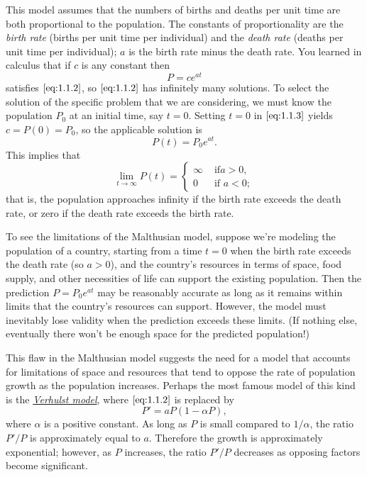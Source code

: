 \documentclass{ximera}
\begin{document}
This model assumes that the numbers of births and deaths per unit time
are both proportional to the population. The constants of
proportionality are  the \textit{birth rate} (births per unit
time per individual) and the \textit{death rate} (deaths per unit time
per individual);     $a$ is the birth rate minus the death rate.
You  learned in calculus that if $c$ is any constant then
\begin{equation} \label{eq:1.1.3}
P=ce^{at}
\end{equation}
satisfies $\eqref{eq:1.1.2}$, so $\eqref{eq:1.1.2}$ has infinitely
many solutions. To select the solution of the specific problem that
we are considering, we must know the population $P_0$ at an initial
time, say $t=0$. Setting $t=0$ in $\eqref{eq:1.1.3}$ yields
$c=P(0)=P_0$, so the applicable solution is
$$
P(t)=P_0e^{at}.
$$
This implies that
$$
\lim_{t\rightarrow\infty}P(t)=\left\{\begin{array}{cl}\infty&\mbox{ if
}a>0,\\ 0&\mbox{ if }a<0;    \end{array}\right.
$$
that is, the population approaches infinity if the birth rate exceeds
the death rate, or zero if the death rate exceeds the birth rate.
 
To see the limitations of the Malthusian model, suppose  we're
modeling the  population of a country, starting from a time
$t=0$ when the birth rate exceeds the death rate (so $a>0$), and
the country's resources in terms of space, food supply, and other
necessities of life can support the existing population. Then the
prediction $P=P_0e^{at}$ may be reasonably accurate as long as
it remains within limits that the country's resources can support.
However, the model must inevitably lose validity when the prediction
exceeds these limits. (If nothing else, eventually there won't be
enough space for the predicted population!)
 
This flaw in the Malthusian model suggests the need for a model that
accounts for limitations of space and resources that tend to oppose
the rate of population growth as the population increases.
 Perhaps the most famous model of this kind is the
\href{https://en.wikipedia.org/wiki/Pierre_Fran%C3%A7ois_Verhulst}
{\textit{Verhulst
 model}}, where $\eqref{eq:1.1.2}$ is
replaced by
\begin{equation} \label{eq:1.1.4}
P'=aP(1-\alpha P),
\end{equation}
where $\alpha$ is a positive constant.
As long as $P$ is small
compared to $1/\alpha$, the ratio $P'/P$  is approximately equal to $a$.
Therefore the growth is approximately exponential;     however, as $P$
increases, the ratio $P'/P$  decreases as opposing factors
become significant.
 
\end{document}
